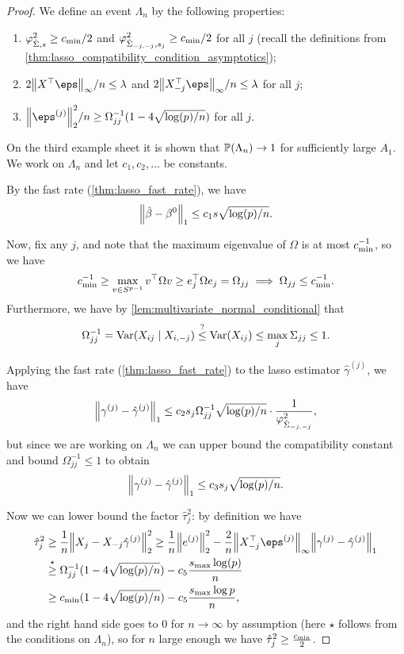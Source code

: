 \begin{proof}
	We define an event $\Lambda_n$ by the following properties:
	\begin{enumerate}
		\item $\varphi^2_{\hat\Sigma, s} \geq c_\mathrm{min} / 2$ and $\varphi^2_{\hat \Sigma_{-j, -j}, s_j} \geq c_\mathrm{min} / 2$ for all $j$ (recall the definitions from \cref{thm:lasso_compatibility_condition_asymptotics});
		
		\item $2\norm{X\T\eps}_\infty / n \leq \lambda$ and $2\norm{X_{-j}\T\eps}_\infty/n \leq \lambda$ for all $j$;
		\item $\norm{\eps^{(j)}}_2^2/n \geq \Omega_{jj}^{-1} (1 - 4\sqrt{\log(p)/n})$ for all $j$.
	\end{enumerate}
On the third example sheet it is shown that $\mathbb P(\Lambda_n) \to 1$ for sufficiently large $A_1$. We work on $\Lambda_n$ and let $c_1, c_2, \dotsc$ be constants. 

By the fast rate (\cref{thm:lasso_fast_rate}), we have
\[
\norm{\hat\beta - \beta^0}_1 \leq c_1 s \sqrt{\log(p)/n}. 
\]

Now, fix any $j$, and note that the maximum eigenvalue of $\Omega$ is at most $c_\mathrm{min}^{-1}$, so we have
\[
c_\mathrm{min}^{-1} \geq \max_{v \in S^{p-1}} v^\top \Omega v \geq e_j^\top \Omega e_j = \Omega_{jj} \implies  \Omega_{jj}\leq c_\mathrm{min}^{-1}. 
\]
Furthermore, we have by \cref{lem:multivariate_normal_conditional} that 
\[
\Omega_{jj}^{-1} = \operatorname{Var}(X_{ij} \mid X_{i, -j}) \overset?\leq \operatorname{Var}(X_{ij}) \leq \max_j \Sigma_{jj} \leq 1.
\]

Applying the fast rate (\cref{thm:lasso_fast_rate}) to the lasso estimator $\hat\gamma^{(j)}$, we have
\begin{align*}
	\norm{\gamma^{(j)} - \hat\gamma^{(j)}}_1 \leq c_2 s_j \Omega_{jj}^{-1} \sqrt{\log(p)/n} \cdot \frac{1}{\varphi^2_{\hat\Sigma_{-j, -j}}},
\end{align*}
but since we are working on $\Lambda_n$ we can upper bound the compatibility constant and bound $\Omega_{jj}^{-1} \leq 1$ to obtain
\[
\norm{\gamma^{(j)} -\hat\gamma^{(j)}}_1 \leq c_3 s_j \sqrt{\log(p)/n}.
\]

Now we can lower bound the factor $\hat\tau_j^2$: by definition we have
\begin{align*}
	\hat \tau_j^2 &\geq \frac1n \norm{X_j - X_{-j} \hat\gamma^{(j)}}_2^2 \geq \frac1n \norm{e^{(j)}}_2^2 - \frac2n \norm{X_{-j}\T \eps^{(j)}}_\infty \norm{\gamma^{(j)} - \hat\gamma^{(j)}}_1 \\
	&\overset\star\geq \Omega_{jj}^{-1} (1 - 4 \sqrt{\log(p)/n}) - c_5 \frac{s_\Rm{max} \log(p)}{n} \\
	&\geq c_\Rm{min}(1 - 4 \sqrt{\log(p)/n}) - c_5 \frac{s_\Rm{max} \log p}{n}, 
\end{align*}
and the right hand side goes to 0 for $n \to\infty$ by assumption (here $\star$ follows from the conditions on $\Lambda_n$), so for $n$ large enough we have $\hat\tau_j^2 \geq \frac{c_\mathrm{min}}{2}$. 


\end{proof}
